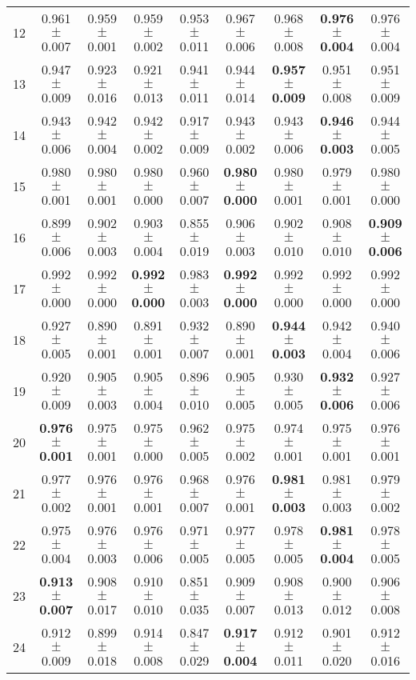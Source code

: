 \begin{table}[!ht]
{\begin{tabular}{r c c c c c c c c}
12 & 0.961 $\pm$ 0.007 & 0.959 $\pm$ 0.001 & 0.959 $\pm$ 0.002 & 0.953 $\pm$ 0.011 & 0.967 $\pm$ 0.006 & 0.968 $\pm$ 0.008 & \textbf{0.976 $\pm$ 0.004} & 0.976 $\pm$ 0.004 \\
13 & 0.947 $\pm$ 0.009 & 0.923 $\pm$ 0.016 & 0.921 $\pm$ 0.013 & 0.941 $\pm$ 0.011 & 0.944 $\pm$ 0.014 & \textbf{0.957 $\pm$ 0.009} & 0.951 $\pm$ 0.008 & 0.951 $\pm$ 0.009 \\
14 & 0.943 $\pm$ 0.006 & 0.942 $\pm$ 0.004 & 0.942 $\pm$ 0.002 & 0.917 $\pm$ 0.009 & 0.943 $\pm$ 0.002 & 0.943 $\pm$ 0.006 & \textbf{0.946 $\pm$ 0.003} & 0.944 $\pm$ 0.005 \\
15 & 0.980 $\pm$ 0.001 & 0.980 $\pm$ 0.001 & 0.980 $\pm$ 0.000 & 0.960 $\pm$ 0.007 & \textbf{0.980 $\pm$ 0.000} & 0.980 $\pm$ 0.001 & 0.979 $\pm$ 0.001 & 0.980 $\pm$ 0.000 \\
16 & 0.899 $\pm$ 0.006 & 0.902 $\pm$ 0.003 & 0.903 $\pm$ 0.004 & 0.855 $\pm$ 0.019 & 0.906 $\pm$ 0.003 & 0.902 $\pm$ 0.010 & 0.908 $\pm$ 0.010 & \textbf{0.909 $\pm$ 0.006} \\
17 & 0.992 $\pm$ 0.000 & 0.992 $\pm$ 0.000 & \textbf{0.992 $\pm$ 0.000} & 0.983 $\pm$ 0.003 & \textbf{0.992 $\pm$ 0.000} & 0.992 $\pm$ 0.000 & 0.992 $\pm$ 0.000 & 0.992 $\pm$ 0.000 \\
18 & 0.927 $\pm$ 0.005 & 0.890 $\pm$ 0.001 & 0.891 $\pm$ 0.001 & 0.932 $\pm$ 0.007 & 0.890 $\pm$ 0.001 & \textbf{0.944 $\pm$ 0.003} & 0.942 $\pm$ 0.004 & 0.940 $\pm$ 0.006 \\
19 & 0.920 $\pm$ 0.009 & 0.905 $\pm$ 0.003 & 0.905 $\pm$ 0.004 & 0.896 $\pm$ 0.010 & 0.905 $\pm$ 0.005 & 0.930 $\pm$ 0.005 & \textbf{0.932 $\pm$ 0.006} & 0.927 $\pm$ 0.006 \\
20 & \textbf{0.976 $\pm$ 0.001} & 0.975 $\pm$ 0.001 & 0.975 $\pm$ 0.000 & 0.962 $\pm$ 0.005 & 0.975 $\pm$ 0.002 & 0.974 $\pm$ 0.001 & 0.975 $\pm$ 0.001 & 0.976 $\pm$ 0.001 \\
21 & 0.977 $\pm$ 0.002 & 0.976 $\pm$ 0.001 & 0.976 $\pm$ 0.001 & 0.968 $\pm$ 0.007 & 0.976 $\pm$ 0.001 & \textbf{0.981 $\pm$ 0.003} & 0.981 $\pm$ 0.003 & 0.979 $\pm$ 0.002 \\
22 & 0.975 $\pm$ 0.004 & 0.976 $\pm$ 0.003 & 0.976 $\pm$ 0.006 & 0.971 $\pm$ 0.005 & 0.977 $\pm$ 0.005 & 0.978 $\pm$ 0.005 & \textbf{0.981 $\pm$ 0.004} & 0.978 $\pm$ 0.005 \\
23 & \textbf{0.913 $\pm$ 0.007} & 0.908 $\pm$ 0.017 & 0.910 $\pm$ 0.010 & 0.851 $\pm$ 0.035 & 0.909 $\pm$ 0.007 & 0.908 $\pm$ 0.013 & 0.900 $\pm$ 0.012 & 0.906 $\pm$ 0.008 \\
24 & 0.912 $\pm$ 0.009 & 0.899 $\pm$ 0.018 & 0.914 $\pm$ 0.008 & 0.847 $\pm$ 0.029 & \textbf{0.917 $\pm$ 0.004} & 0.912 $\pm$ 0.011 & 0.901 $\pm$ 0.020 & 0.912 $\pm$ 0.016 \\

\end{tabular}}
\end{table}
